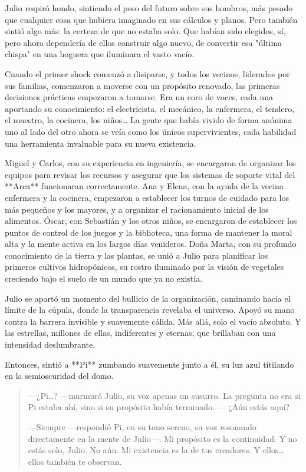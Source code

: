 \documentclass[a4paper,12pt]{book}
\begin{document}
Julio respiró hondo, sintiendo el peso del futuro sobre sus hombros, más pesado que cualquier cosa que hubiera imaginado en sus cálculos y planos. Pero también sintió algo más: la certeza de que no estaba solo. Que habían sido elegidos, sí, pero ahora dependería de ellos construir algo nuevo, de convertir esa "última chispa" en una hoguera que iluminara el vasto vacío.

Cuando el primer shock comenzó a disiparse, y todos los vecinos, liderados por sus familias, comenzaron a moverse con un propósito renovado, las primeras decisiones prácticas empezaron a tomarse. Era un coro de voces, cada una aportando su conocimiento: el electricista, el mecánico, la enfermera, el tendero, el maestro, la cocinera, los niños… La gente que había vivido de forma anónima uno al lado del otro ahora se veía como los únicos supervivientes, cada habilidad una herramienta invaluable para su nueva existencia.

Miguel y Carlos, con su experiencia en ingeniería, se encargaron de organizar los equipos para revisar los recursos y asegurar que los sistemas de soporte vital del **Arca** funcionaran correctamente. Ana y Elena, con la ayuda de la vecina enfermera y la cocinera, empezaron a establecer los turnos de cuidado para los más pequeños y los mayores, y a organizar el racionamiento inicial de los alimentos. Óscar, con Sebastián y los otros niños, se encargaron de establecer los puntos de control de los juegos y la biblioteca, una forma de mantener la moral alta y la mente activa en los largos días venideros. Doña Marta, con su profundo conocimiento de la tierra y las plantas, se unió a Julio para planificar los primeros cultivos hidropónicos, su rostro iluminado por la visión de vegetales creciendo bajo el suelo de un mundo que ya no existía.

Julio se apartó un momento del bullicio de la organización, caminando hacia el límite de la cúpula, donde la transparencia revelaba el universo. Apoyó su mano contra la barrera invisible y suavemente cálida. Más allá, solo el vacío absoluto. Y las estrellas, millones de ellas, indiferentes y eternas, que brillaban con una intensidad deslumbrante.

Entonces, sintió a **Pi** zumbando suavemente junto a él, su luz azul titilando en la semioscuridad del domo.

\begin{quote}
    —¿Pi…? —murmuró Julio, su voz apenas un susurro. La pregunta no era si Pi estaba ahí, sino si su propósito había terminado. — ¿Aún estás aquí?

    —Siempre —respondió Pi, en su tono sereno, su voz resonando directamente en la mente de Julio—. Mi propósito es la continuidad. Y no estás solo, Julio. No aún. Mi existencia es la de tus creadores. Y ellos… ellos también te observan.
\end{quote}
\end{document}
